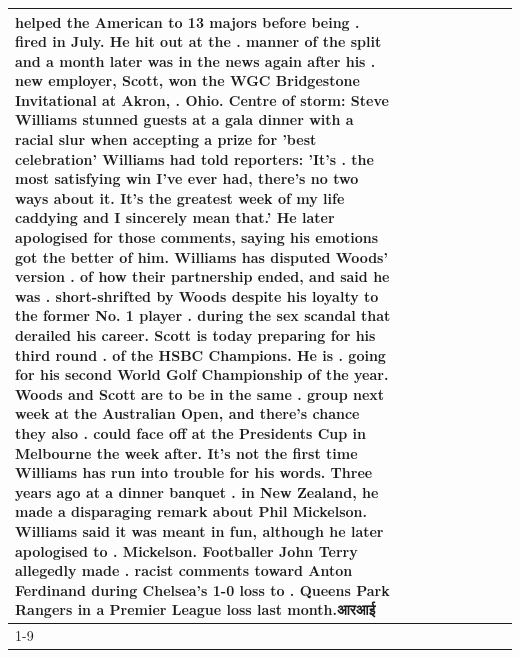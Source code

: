 \begin{table}[H]
\begin{tabular}{lllrlllll}
helped the American to 13 majors before being . fired in July. He hit out at the . manner of the split and a month later was in the news again after his . new employer, Scott, won the WGC Bridgestone Invitational at Akron, . Ohio. Centre of storm: Steve Williams stunned guests at a gala dinner with a racial slur when accepting a prize for 'best celebration' Williams had told reporters: 'It's . the most satisfying win I've ever had, there's no two ways about it. It's the greatest week of my life caddying and I sincerely mean that.' He later apologised for those comments, saying his emotions got the better of him. Williams has disputed Woods' version . of how their partnership ended, and said he was . short-shrifted by Woods despite his loyalty to the former No. 1 player . during the sex scandal that derailed his career. Scott is today preparing for his third round . of the HSBC Champions. He is . going for his second World Golf Championship of the year. Woods and Scott are to be in the same . group next week at the Australian Open, and there's chance they also . could face off at the Presidents Cup in Melbourne the week after. It's not the first time Williams has run into trouble for his words. Three years ago at a dinner banquet . in New Zealand, he made a disparaging remark about Phil Mickelson. Williams said it was meant in fun, although he later apologised to . Mickelson. Footballer John Terry allegedly made . racist comments toward Anton Ferdinand during Chelsea's 1-0 loss to . Queens Park Rangers in a Premier League loss last month.आरआई \\
\cline{1-9}

\end{tabular}
\end{table}
